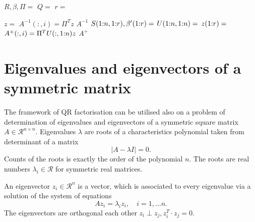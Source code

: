 \begin{refsection}
\begin{algorithm}
  \caption{(Pseudo-)Inverse of a matrix}
  \label{alg:qrinv}
  \begin{algorithmic}
    \State {}
    \State {}

    \State $R,\beta,\Pi = $ 
    \State $Q = $ 
    \State $r = $ 

    \State $z =$ 
    \State $A^{-1}(:,i) = \Pi^T z$
    \EndFor
    \State \Return $A^{-1}$
    \State $S(1{:}n,1{:}r),\beta'(1{:}r) = $
    \State $U(1{:}n,1{:}n)=$
    \State $z(1{:}r) = $ 
    \State $A^+(:,i) = \Pi^T U(:,1{:}n) z$
    \EndFor
    \State \Return $A^+$
    \EndIf
    \EndFunction
  \end{algorithmic}
\end{algorithm}



\section{Eigenvalues and eigenvectors of a symmetric matrix}

The framework of QR factorisation can be utilised also
on a problem of determination of eigenvalues and
eigenvectors of a symmetric square matrix $A \in \mathcal{R}^{n \times n}$.
Eigenvalues $\lambda$ are roots of a characteristics
polynomial taken from determinant of a matrix
\begin{equation}
  \lvert A  - \lambda I \rvert = 0.
\end{equation}
Counts of the roots is exactly the order of the polynomial $n$.
The roots are real numbers $\lambda_i \in \mathcal{R}$ for
symmetric real matrices.

An eigenvector $z_i \in \mathcal{R}^n$ is a vector, which is associated
to every eigenvalue via a solution of the system of equations
\begin{equation} \label{eg:eigenvec}
  A z_i = \lambda_i z_i, \quad i = 1, \ldots n.
\end{equation}
The eigenvectors are orthogonal each other $z_i \perp z_j, z_i^T \cdot z_j = 0$.


\end{refsection}
